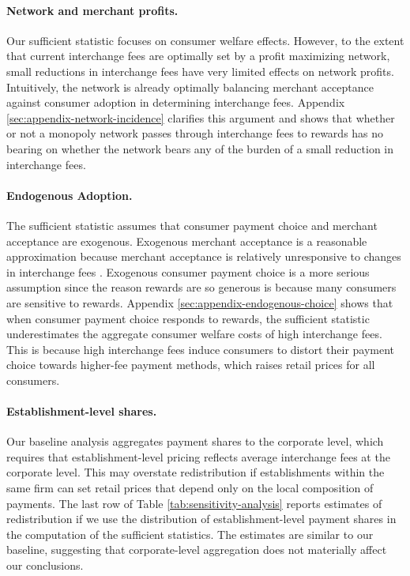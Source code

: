 \documentclass[main.tex]{subfiles}
\begin{document}
\paragraph{Network and merchant profits.}
Our sufficient statistic focuses on consumer welfare effects.
However, to the extent that current interchange fees are optimally set by a profit maximizing network, small reductions in interchange fees have very limited effects on network profits.
Intuitively, the network is already optimally balancing merchant acceptance against consumer adoption in determining interchange fees.
Appendix \ref{sec:appendix-network-incidence} clarifies this argument and shows that whether or not a monopoly network passes through interchange fees to rewards has no bearing on whether the network bears any of the burden of a small reduction in interchange fees.

\paragraph{Endogenous Adoption.}
The sufficient statistic assumes that consumer payment choice and merchant acceptance are exogenous.
Exogenous merchant acceptance is a reasonable approximation because merchant acceptance is relatively unresponsive to changes in interchange fees \citep{Wang2025}.
Exogenous consumer payment choice is a more serious assumption since the reason rewards are so generous is because many consumers are sensitive to rewards.
Appendix \ref{sec:appendix-endogenous-choice} shows that when consumer payment choice responds to rewards, the sufficient statistic underestimates the aggregate consumer welfare costs of high interchange fees.
This is because high interchange fees induce consumers to distort their payment choice towards higher-fee payment methods, which raises retail prices for all consumers.

\paragraph{Establishment-level shares.}
Our baseline analysis aggregates payment shares to the corporate level, which requires that establishment-level pricing reflects average interchange fees at the corporate level. 
This may overstate redistribution if establishments within the same firm can set retail prices that depend only on the local composition of payments.
The last row of Table \ref{tab:sensitivity-analysis} reports estimates of redistribution if we use the distribution of establishment-level payment shares in the computation of the sufficient statistics.
The estimates are similar to our baseline, suggesting that corporate-level aggregation does not materially affect our conclusions.
\end{document}
